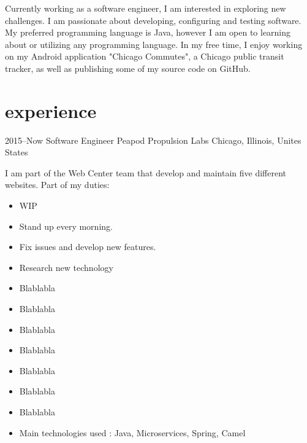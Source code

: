 \documentclass[]{friggeri-cv} %
\begin{document}
Currently working as a software engineer, I am interested in exploring new challenges. I am passionate about developing, configuring and testing software. My preferred programming language is Java, however I am open to learning about or utilizing any programming language. In my free time, I enjoy working on my Android application "Chicago Commutes", a Chicago public transit tracker, as well as publishing some of my source code on GitHub.



\section{experience}


\begin{entrylist}

\entry
{2015--Now}
{Software Engineer} 
{Peapod Propulsion Labs}
{Chicago, Illinois, Unites States}
{I am part of the Web Center team that develop and maintain five different websites. Part of my duties:\\

\vspace{-4mm}
\begin{itemize}
	\item WIP
	\item Stand up every morning.
	\item Fix issues and develop new features.
	\item Research new technology
	\item Blablabla
	\item Blablabla
	\item Blablabla
	\item Blablabla
	\item Blablabla
	\item Blablabla
	\item Blablabla
	\item Main technologies used : Java, Microservices, Spring, Camel
\end{itemize}}
\vspace{-7mm}

\end{entrylist}

\end{document}
